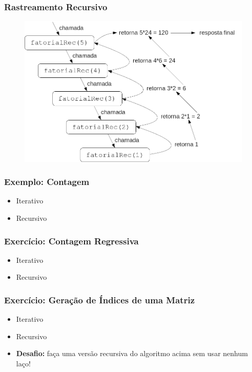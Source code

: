 \documentclass[aspectratio=169]{beamer}
\begin{document}
\begin{frame}\frametitle{Rastreamento Recursivo}
\begin{figure}[h]
	\centering
	\includegraphics[height=0.7\paperheight]{imagens/rastreamento_recursivo.png}
\end{figure}
\end{frame}

\begin{frame}\frametitle{Exemplo: Contagem}
\begin{itemize}
	\item Iterativo
{\scriptsize}
	\pause
	\item Recursivo
{\scriptsize}
\end{itemize}
\end{frame}

\begin{frame}\frametitle{Exercício: Contagem Regressiva}
\begin{itemize}
	\item Iterativo
{\scriptsize}
	\pause
	\item Recursivo
{\scriptsize}
\end{itemize}
\end{frame}

\begin{frame}\frametitle{Exercício: Geração de Índices de uma Matriz}
\begin{itemize}
	\item Iterativo
{\scriptsize}
	\pause
	\item Recursivo
{\scriptsize}
	\pause
	\item \textbf{Desafio:} faça uma versão recursiva do algoritmo acima sem usar nenhum laço!
\end{itemize}
\end{frame}
\end{document}
